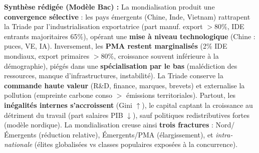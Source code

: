 \documentclass[11pt]{article}
\begin{document}
\begin{exoresolu}
    \tcblower
    \textbf{Synthèse rédigée (Modèle Bac) :}
    La mondialisation produit une \textbf{convergence sélective} : les pays émergents (Chine, Inde, Vietnam) rattrapent la Triade par l'industrialisation exportatrice (part manuf. export $>80\%$, IDE entrants majoritaires 65\%), opérant une \textbf{mise à niveau technologique} (Chine : puces, VE, IA). Inversement, les \textbf{PMA restent marginalisés} (2\% IDE mondiaux, export primaires $>80\%$, croissance souvent inférieure à la démographie), piégés dans une \textbf{spécialisation par le bas} (malédiction des ressources, manque d'infrastructures, instabilité). La Triade conserve la \textbf{commande haute valeur} (R\&D, finance, marques, brevets) et externalise la pollution (empreinte carbone conso $>$ émissions territoriales). Partout, les \textbf{inégalités internes s'accroissent} (Gini $\uparrow$), le capital captant la croissance au détriment du travail (part salaires PIB $\downarrow$), sauf politiques redistributives fortes (modèle nordique). La mondialisation creuse ainsi \textbf{trois fractures} : Nord/Émergents (réduction relative), Émergents/PMA (élargissement), et \emph{intra-nationale} (élites globalisées vs classes populaires exposées à la concurrence).
\end{exoresolu}
\end{document}
